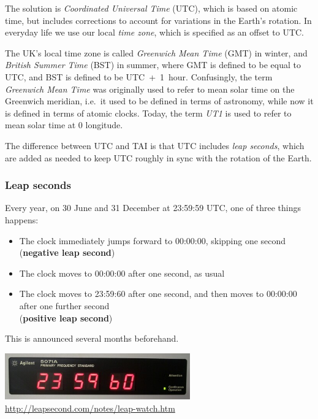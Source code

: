 \label{l:utc}

The solution is \emph{Coordinated Universal Time} (UTC), which is based on atomic time, but includes corrections to account for variations in the Earth's rotation.
In everyday life we use our local \emph{time zone}, which is specified as an offset to UTC.

The UK's local time zone is called \emph{Greenwich Mean Time} (GMT) in winter, and \emph{British Summer Time} (BST) in summer, where GMT is defined to be equal to UTC, and BST is defined to be UTC~+~1~hour.
Confusingly, the term \emph{Greenwich Mean Time} was originally used to refer to mean solar time on the Greenwich meridian, i.e.\ it used to be defined in terms of astronomy, while now it is defined in terms of atomic clocks.
Today, the term \emph{UT1} is used to refer to mean solar time at 0{\textdegree} longitude.

The difference between UTC and TAI is that UTC includes \emph{leap seconds}, which are added as needed to keep UTC roughly in sync with the rotation of the Earth.

\begin{frame}
    \label{s:leap-seconds}
    \frametitle{Leap seconds}
    Every year, on 30 June and 31 December at 23:59:59 UTC, one of three things happens:
    \begin{itemize}
        \item The clock immediately jumps forward to 00:00:00, skipping one second (\textbf{negative leap second})
        \item The clock moves to 00:00:00 after one second, as usual
        \item The clock moves to 23:59:60 after one second, and then moves to 00:00:00 after one further second\\
            (\textbf{positive leap second})
    \end{itemize}
    This is announced several months beforehand.
    \begin{center}
        \includegraphics[width=8cm]{images/leap-second.jpg}
        \scriptsize\url{http://leapsecond.com/notes/leap-watch.htm}
    \end{center}
\end{frame}
\label{l:leap-seconds}

